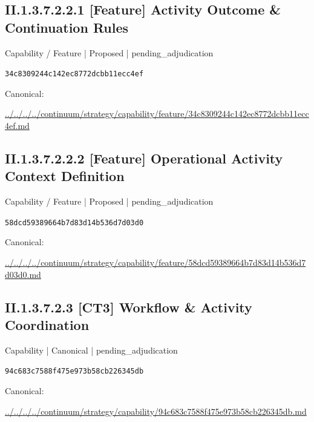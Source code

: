 \documentclass[10pt,a4paper]{article}
\begin{document}
\subsection*{II.1.3.7.2.2.1 [Feature] Activity Outcome \& Continuation Rules}
\label{element-34c8309244c142ec8772dcbb11ecc4ef}
{\small Capability / Feature | Proposed | pending\_adjudication}\par
\texttt{34c8309244c142ec8772dcbb11ecc4ef}\par
Canonical: \par
{\footnotesize\url{../../../../continuum/strategy/capability/feature/34c8309244c142ec8772dcbb11ecc4ef.md}}\par
\subsection*{II.1.3.7.2.2.2 [Feature] Operational Activity Context Definition}
\label{element-58dcd59389664b7d83d14b536d7d03d0}
{\small Capability / Feature | Proposed | pending\_adjudication}\par
\texttt{58dcd59389664b7d83d14b536d7d03d0}\par
Canonical: \par
{\footnotesize\url{../../../../continuum/strategy/capability/feature/58dcd59389664b7d83d14b536d7d03d0.md}}\par
\subsection*{II.1.3.7.2.3 [CT3] Workflow \& Activity Coordination}
\label{element-94c683c7588f475e973b58cb226345db}
{\small Capability | Canonical | pending\_adjudication}\par
\texttt{94c683c7588f475e973b58cb226345db}\par
Canonical: \par
{\footnotesize\url{../../../../continuum/strategy/capability/94c683c7588f475e973b58cb226345db.md}}\par
\end{document}
